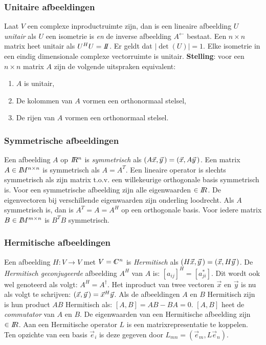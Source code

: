 \documentclass[twoside]{report}
\begin{document}
\subsubsection{Unitaire afbeeldingen}
Laat $V$ een complexe inproductruimte zijn, dan is een lineaire afbeelding $U$
{\it unitair} als $U$ een isometrie is {\it en} de inverse afbeelding
$A^\leftarrow$ bestaat. Een $n\times n$ matrix heet unitair als $U^HU=I\hspace{-1mm}I$.
Er geldt dat $|\det(U)|=1$.
Elke isometrie in een eindig dimensionale complexe vectorruimte is unitair.
\npar
{\bf Stelling}: voor een $n\times n$ matrix $A$ zijn de volgende uitspraken
equivalent:
\begin{enumerate}
\item $A$ is unitair,
\item De kolommen van $A$ vormen een orthonormaal stelsel,
\item De rijen van $A$ vormen een orthonormaal stelsel.
\end{enumerate}

\subsubsection{Symmetrische afbeeldingen}
Een afbeelding $A$ op $I\hspace{-1mm}R^n$ is {\it symmetrisch} als
$(A\vec{x},\vec{y}\,)=(\vec{x},A\vec{y}\,)$. Een matrix $A\in I\hspace{-1mm}M^{n\times n}$
is symmetrisch als $A=A^T$. Een lineaire operator is slechts symmetrisch als
zijn matrix t.o.v. een willekeurige orthogonale basis symmetrisch is. Voor
een symmetrische afbeelding zijn alle eigenwaarden $\in I\hspace{-1mm}R$. De eigenvectoren
bij verschillende eigenwaarden zijn onderling loodrecht.
Als $A$ symmetrisch is, dan is $A^T=A=A^H$ op een orthogonale basis.
\npar
Voor iedere matrix $B\in I\hspace{-1mm}M^{m\times n}$ is $B^TB$ symmetrisch.

\subsubsection{Hermitische afbeeldingen}
Een afbeelding $H:V\rightarrow V$ met $V=\CC^n$ is {\it Hermitisch} als
$(H\vec{x},\vec{y}\,)=(\vec{x},H\vec{y}\,)$. De {\it Hermitisch geconjugeerde}
afbeelding $A^H$ van $A$ is: $[a_{ij}]^H=[a_{ji}^*]$. Dit wordt ook wel
genoteerd als volgt: $A^H=A^\dagger$. Het inproduct van twee vectoren $\vec{x}$
en $\vec{y}$ is nu als volgt te schrijven: $(\vec{x},\vec{y}\,)=\vec{x}^H\vec{y}$.
\npar
Als de afbeeldingen $A$ en $B$ Hermitisch zijn is hun product $AB$ Hermitisch
als: $[A,B]=AB-BA=0$. $[A,B]$ heet de {\it commutator} van $A$ en $B$.
\npar
De eigenwaarden van een Hermitische afbeelding zijn $\in I\hspace{-1mm}R$.
\npar
Aan een Hermitische operator $L$ is een matrixrepresentatie te koppelen.
Ten opzichte van een basis $\vec{e}_i$ is deze gegeven door
$L_{mn}=(\vec{e}_m,L\vec{e}_n)$.
\end{document}
